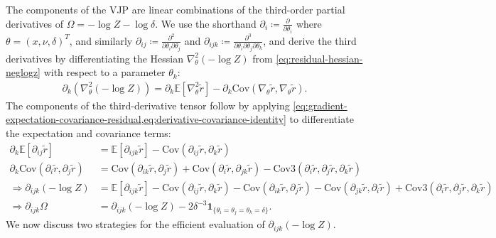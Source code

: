 \documentclass{article}
\begin{document}
The components of the VJP are linear combinations of the third-order partial derivatives of $\Omega = -\log Z - \log\delta$.
We use the shorthand $\partial_i \coloneqq \frac{\partial}{\partial \theta_i}$ where $\theta = (x, \nu, \delta)^T$, and similarly $\partial_{ij} \coloneqq \frac{\partial^2}{\partial \theta_i \partial \theta_j}$ and $\partial_{ijk} \coloneqq \frac{\partial^3}{\partial \theta_i \partial \theta_j \partial \theta_k}$, and derive the third derivatives by differentiating the Hessian $\nabla_{\theta}^2 (-\log Z)$ from \cref{eq:residual-hessian-neglogz} with respect to a parameter $\theta_k$:
%
\begin{align}
  \partial_{k}(\nabla_{\theta}^2 (-\log Z)) = \partial_{k} \mathbb{E}[\nabla_\theta^2 \tilde{r}] - \partial_{k}\mathrm{Cov}(\nabla_\theta \tilde{r}, \nabla_\theta \tilde{r}).
\end{align}
%
The components of the third-derivative tensor follow by applying \cref{eq:gradient-expectation-covariance-residual,eq:derivative-covariance-identity} to differentiate the expectation and covariance terms:
%
\begin{align}
  \partial_{k} \mathbb{E}[\partial_{ij} \tilde{r}]                         & = \mathbb{E}[\partial_{ijk} \tilde{r}] - \mathrm{Cov}(\partial_{ij} \tilde{r}, \partial_{k} \tilde{r})                                                                                                                                                                                                                                                             \\
  \partial_{k}\mathrm{Cov}(\partial_{i} \tilde{r}, \partial_{j} \tilde{r}) & = \mathrm{Cov}(\partial_{ik} \tilde{r}, \partial_{j} \tilde{r}) + \mathrm{Cov}(\partial_{i} \tilde{r}, \partial_{jk} \tilde{r}) - \mathrm{Cov3}(\partial_{i} \tilde{r}, \partial_{j} \tilde{r}, \partial_{k} \tilde{r})                                                                                                                                            \\
  \Rightarrow \partial_{ijk} (-\log Z)                                     & = \mathbb{E}[\partial_{ijk} \tilde{r}] - \mathrm{Cov}(\partial_{ij} \tilde{r}, \partial_{k} \tilde{r}) - \mathrm{Cov}(\partial_{ik} \tilde{r}, \partial_{j} \tilde{r}) - \mathrm{Cov}(\partial_{jk} \tilde{r}, \partial_{i} \tilde{r}) + \mathrm{Cov3}(\partial_{i} \tilde{r}, \partial_{j} \tilde{r}, \partial_{k} \tilde{r}) \label{eq:neglogz-third-derivative} \\
  \Rightarrow \partial_{ijk} \Omega                                        & = \partial_{ijk} (-\log Z) - 2\delta^{-3} \mathbf{1}_{\{\theta_i=\theta_j=\theta_k=\delta\}}. \label{eq:omega-third-derivative-qrician}
\end{align}
%
We now discuss two strategies for the efficient evaluation of $\partial_{ijk}(-\log Z)$.
\end{document}
